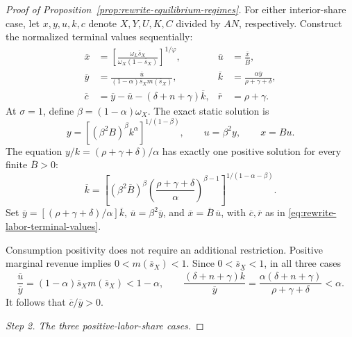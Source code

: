 \begin{proof}[Proof of Proposition~\ref{prop:rewrite-equilibrium-regimes}]
For either interior-share case, let $x,y,u,k,c$ denote $X,Y,U,K,C$ divided
by $AN$, respectively. Construct the normalized terminal values sequentially:
\begin{align}
 \overline x&=
 \left[\frac{\omega_L\overline s_X}
 {\omega_X(1-\overline s_X)}\right]^{1/\varphi},
 &\overline u&=\frac{\overline x}{\overline B},\nonumber\\
 \overline y&=
 \frac{\overline u}{(1-\alpha)\overline s_Xm(\overline s_X)},
 &\overline k&=\frac{\alpha\overline y}{\rho+\gamma+\delta},\nonumber\\
 \overline c&=\overline y-\overline u
       -(\delta+n+\gamma)\overline k,
 &\overline r&=\rho+\gamma.
 \label{eq:rewrite-labor-terminal-values}
\end{align}
At $\sigma=1$, define $\beta=(1-\alpha)\omega_X$.
The exact static solution is
\[
 y=\left[(\beta^2B)^\beta k^\alpha\right]^{1/(1-\beta)},
 \qquad u=\beta^2y,\qquad x=Bu.
\]
The equation $y/k=(\rho+\gamma+\delta)/\alpha$ has exactly one positive
solution for every finite $\overline B>0$:
\begin{equation}
 \overline k=
 \left[(\beta^2\overline B)^\beta
 \left(\frac{\rho+\gamma+\delta}{\alpha}\right)^{\beta-1}
 \right]^{1/(1-\alpha-\beta)}.
 \label{eq:rewrite-unit-terminal-capital}
\end{equation}
Set
$\overline y=[(\rho+\gamma+\delta)/\alpha]\overline k$,
$\overline u=\beta^2\overline y$,
and $\overline x=\overline B\,\overline u$, with $\overline c,\overline r$
as in \eqref{eq:rewrite-labor-terminal-values}.

Consumption positivity does not require an additional restriction.
Positive marginal revenue implies $0<m(\overline s_X)<1$.
Since $0<\overline s_X<1$, in all three cases
\[
 \frac{\overline u}{\overline y}
 =(1-\alpha)\overline s_Xm(\overline s_X)<1-\alpha,\qquad
 \frac{(\delta+n+\gamma)\overline k}{\overline y}
 =\frac{\alpha(\delta+n+\gamma)}{\rho+\gamma+\delta}<\alpha.
\]
It follows that $\overline c/\overline y>0$.

\par\medskip\noindent\textit{Step 2. The three positive-labor-share cases.}


\end{proof}
